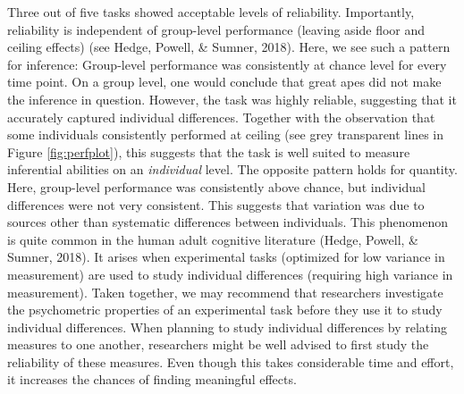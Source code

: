 \documentclass[10pt, letterpaper]{article}
\begin{document}
Three out of five tasks showed acceptable levels of reliability.
Importantly, reliability is independent of group-level performance
(leaving aside floor and ceiling effects) (see Hedge, Powell, \& Sumner,
2018). Here, we see such a pattern for inference: Group-level
performance was consistently at chance level for every time point. On a
group level, one would conclude that great apes did not make the
inference in question. However, the task was highly reliable, suggesting
that it accurately captured individual differences. Together with the
observation that some individuals consistently performed at ceiling (see
grey transparent lines in Figure \ref{fig:perfplot}), this suggests that
the task is well suited to measure inferential abilities on an
\emph{individual} level. The opposite pattern holds for quantity. Here,
group-level performance was consistently above chance, but individual
differences were not very consistent. This suggests that variation was
due to sources other than systematic differences between individuals.
This phenomenon is quite common in the human adult cognitive literature
(Hedge, Powell, \& Sumner, 2018). It arises when experimental tasks
(optimized for low variance in measurement) are used to study individual
differences (requiring high variance in measurement). Taken together, we
may recommend that researchers investigate the psychometric properties
of an experimental task before they use it to study individual
differences. When planning to study individual differences by relating
measures to one another, researchers might be well advised to first
study the reliability of these measures. Even though this takes
considerable time and effort, it increases the chances of finding
meaningful effects.
\end{document}
